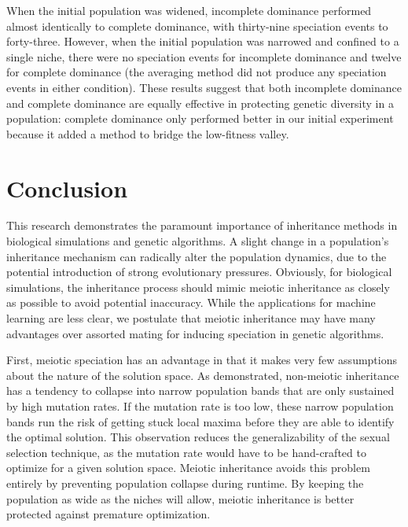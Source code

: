 \documentclass{article}
\begin{document}
When the initial population was widened, incomplete dominance performed almost identically to complete dominance, with thirty-nine speciation events to forty-three. However, when the initial population was narrowed and confined to a single niche, there were no speciation events for incomplete dominance and twelve for complete dominance (the averaging method did not produce any speciation events in either condition). These results suggest that both incomplete dominance and complete dominance are equally effective in protecting genetic diversity in a population: complete dominance only performed better in our initial experiment because it added a method to bridge the low-fitness valley.



\section{Conclusion}

This research demonstrates the paramount importance of inheritance methods in biological simulations and genetic algorithms. A slight change in a population’s inheritance mechanism can radically alter the population dynamics, due to the potential introduction of strong evolutionary pressures. Obviously, for biological simulations, the inheritance process should mimic meiotic inheritance as closely as possible to avoid potential inaccuracy. While the applications for machine learning are less clear, we postulate that meiotic inheritance may have many advantages over assorted mating for inducing speciation in genetic algorithms.

First, meiotic speciation has an advantage in that it makes very few assumptions about the nature of the solution space. As demonstrated, non-meiotic inheritance has a tendency to collapse into narrow population bands that are only sustained by high mutation rates. If the mutation rate is too low, these narrow population bands run the risk of getting stuck local maxima before they are able to identify the optimal solution. This observation reduces the generalizability of the sexual selection technique, as the mutation rate would have to be hand-crafted to optimize for a given solution space. Meiotic inheritance avoids this problem entirely by preventing population collapse during runtime. By keeping the population as wide as the niches will allow, meiotic inheritance is better protected against premature optimization.
\end{document}
